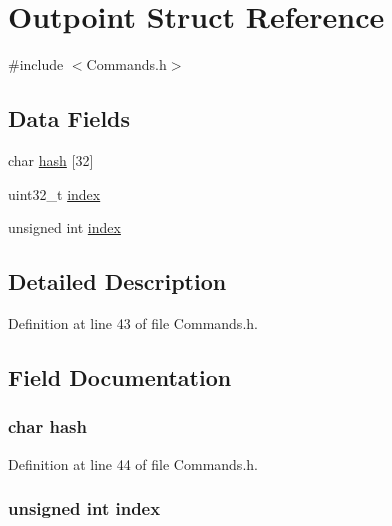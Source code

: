 \hypertarget{struct_outpoint}{
\section{Outpoint Struct Reference}
\label{struct_outpoint}
}


{\ttfamily \#include $<$Commands.h$>$}

\subsection*{Data Fields}
\begin{DoxyCompactItemize}
\item 
char \hyperlink{struct_outpoint_a49e83595c89cca1c8cd37b9af318a908}{hash} \mbox{[}32\mbox{]}
\item 
uint32\_\-t \hyperlink{struct_outpoint_aafd95f8c7a99b9189ede7cdf0871ebe8}{index}
\item 
unsigned int \hyperlink{struct_outpoint_a589d64202487f78e3cc30dd2e04c5201}{index}
\end{DoxyCompactItemize}


\subsection{Detailed Description}


Definition at line 43 of file Commands.h.



\subsection{Field Documentation}
\hypertarget{struct_outpoint_a49e83595c89cca1c8cd37b9af318a908}{
\subsubsection[{hash}]{\setlength{\rightskip}{0pt plus 5cm}char {\bf hash}}}
\label{struct_outpoint_a49e83595c89cca1c8cd37b9af318a908}


Definition at line 44 of file Commands.h.

\hypertarget{struct_outpoint_a589d64202487f78e3cc30dd2e04c5201}{
\subsubsection[{index}]{\setlength{\rightskip}{0pt plus 5cm}unsigned int {\bf index}}}
\label{struct_outpoint_a589d64202487f78e3cc30dd2e04c5201}


